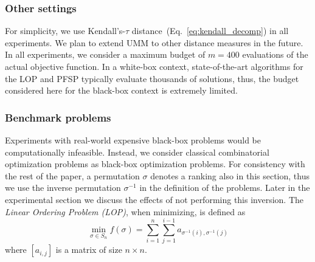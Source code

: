 \documentclass[sigconf,dvipsnames]{acmart}
\newcommand{\FEmax}{\ensuremath{m}}
\begin{document}
\subsubsection{Other settings}
%
For simplicity, we use Kendall's-$\tau$
distance~(Eq.~\ref{eq:kendall_decomp}) in all experiments.
We plan to extend UMM to other distance measures in the future.  In all
experiments, we consider a maximum budget of $\FEmax=400$ evaluations of the
actual objective function. In a white-box context, state-of-the-art algorithms
for the LOP and PFSP typically evaluate thousands of solutions,
thus, the budget considered here for the black-box context is extremely
limited.


\subsubsection{Benchmark problems}
%
Experiments with real-world expensive black-box problems would be computationally infeasible. Instead, we consider classical combinatorial optimization problems as black-box optimization problems. For consistency with the rest of the paper, a permutation $\sigma$ denotes a ranking also in this section, thus we use the inverse permutation $\sigma^{-1}$ in the definition of the problems. Later in the experimental section we discuss the effects of not performing this inversion.
%
The \emph{Linear Ordering Problem (LOP)}, when minimizing, is defined as
\begin{equation}\label{eq:lop}
  \min_{\sigma \in S_n} f(\sigma) = \sum_{i=1}^{n} \sum_{j=1}^{i-1}  a_{\sigma^{-1}(i), \sigma^{-1}(j)}
\end{equation}
%
where $[a_{i,j}]$ is a matrix of size $n \times n$.

\end{document}
